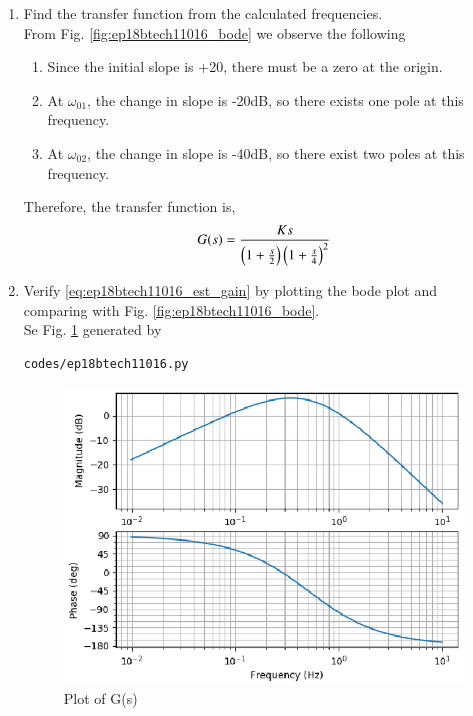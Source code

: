 \begin{enumerate}[label=\thesection.\arabic*.,ref=\thesection.\theenumi]

\item Find the transfer function from the calculated frequencies.
\\
\solution  From Fig.     \ref{fig:ep18btech11016_bode} we observe the following

\begin{enumerate}
\item Since the initial slope is +20, there must be a zero at the origin.
\item At $\omega_{01}$, the change in slope is -20dB, so there exists one pole at this frequency.
\item At $\omega_{02}$, the change in slope is -40dB, so there exist two poles at this frequency.
\end{enumerate}
Therefore, the transfer function is,
\begin{align}
\label{eq:ep18btech11016_est_gain}
   G(s) =  \frac{Ks}{\left(1 + \frac{s}{2}\right)\left(1 + \frac{s}{4}\right)^2} 
\end{align}



\item Verify \eqref{eq:ep18btech11016_est_gain} by plotting the bode plot and comparing with   Fig.  \ref{fig:ep18btech11016_bode}.
\\
\solution Se Fig. \ref{fig:ep18btech11016_fig2} generated by 
\begin{lstlisting}
codes/ep18btech11016.py
\end{lstlisting}
\begin{center}
    \begin{figure}[!h]
    \centering
    \includegraphics[width=\columnwidth]{./figs/ep18btech11016/ep18btech11016_fig2.eps}
    \caption{Plot of G(s)}
    \label{fig:ep18btech11016_fig2}
    \end{figure}
\end{center}


\end{enumerate}
